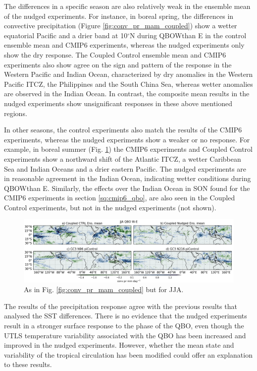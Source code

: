 The differences in a specific season are also relatively weak in the ensemble mean of the nudged experiments. 
For instance, in boreal spring, the differences in convective precipitation (Figure \ref{fig:conv_pr_mam_coupled}) show a wetter equatorial Pacific and a drier band at 10$^\circ$N during QBOWthan E in the control ensemble mean and CMIP6 experiments, whereas the nudged experiments only show the dry response. The Coupled Control ensemble mean and CMIP6 experiments also show agree on the sign and pattern of the response in the Western Pacific and Indian Ocean, characterized by dry anomalies in the Western Pacific ITCZ, the Philippines and the South China Sea, whereas wetter anomalies are observed in the Indian Ocean. 
In contrast, the composite mean results in the nudged experiments show unsignificant responses in these above mentioned regions. 



In other seasons, the control experiments also match the results of the CMIP6 experiments, whereas the nudged experiments show a weaker or no response. For example, in boreal summer (Fig. \ref{fig:conv_pr_jja_coupled}) the CMIP6 experiments and Coupled Control experiments show a northward shift of the Atlantic ITCZ, a wetter Caribbean Sea and Indian Oceans and a drier eastern Pacific. The nudged experiments are in reasonable agreement in the Indian Ocean, indicating wetter conditions during QBOWthan E.
Similarly, the effects over the Indian Ocean in SON found for the CMIP6 experiments in section \ref{sq:cmip6_qbo}, are also seen in the Coupled Control experiments, but not in the nudged experiments (not shown).


\begin{figure}[t!]
\centering
 \includegraphics[width=\linewidth]{figures/conv_prseasonal_jjaqbowqboe.png}
\caption[ Convective precipitation response in JJA]{As in Fig. \ref{fig:conv_pr_mam_coupled} but for JJA.}
\label{fig:conv_pr_jja_coupled}
\end{figure}

The results of the precipitation response agree with the previous results that analysed the SST differences. There is no evidence that the nudged experiments result in a stronger surface response to the phase of the QBO, even though the UTLS temperature variability associated with the QBO has been increased and improved in the nudged experiments. 
However, whether the mean state and variability of the tropical circulation has been modified could offer an explanation to these results.

